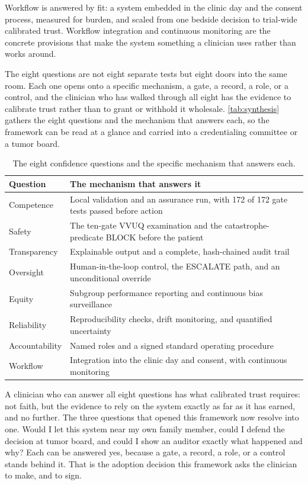 Workflow is answered by fit: a system embedded in the clinic day and the consent
process, measured for burden, and scaled from one bedside decision to trial-wide
calibrated trust. Workflow integration and continuous monitoring are the concrete
provisions that make the system something a clinician uses rather than works around.

The eight questions are not eight separate tests but eight doors into the same room.
Each one opens onto a specific mechanism, a gate, a record, a role, or a control,
and the clinician who has walked through all eight has the evidence to calibrate
trust rather than to grant or withhold it wholesale. \autoref{tab:synthesis}
gathers the eight questions and the mechanism that answers each, so the framework
can be read at a glance and carried into a credentialing committee or a tumor board.

\begin{table}[H]
\footnotesize
\begin{tabularx}{\textwidth}{@{}L{3.0cm} Y@{}}
\toprule
\textbf{Question} & \textbf{The mechanism that answers it}\\
\midrule
Competence & Local validation and an assurance run, with 172 of 172 gate tests passed before action\\
Safety & The ten-gate VVUQ examination and the catastrophe-predicate BLOCK before the patient\\
Transparency & Explainable output and a complete, hash-chained audit trail\\
Oversight & Human-in-the-loop control, the ESCALATE path, and an unconditional override\\
Equity & Subgroup performance reporting and continuous bias surveillance\\
Reliability & Reproducibility checks, drift monitoring, and quantified uncertainty\\
Accountability & Named roles and a signed standard operating procedure\\
Workflow & Integration into the clinic day and consent, with continuous monitoring\\
\bottomrule
\end{tabularx}
\caption{The eight confidence questions and the specific mechanism that answers each.}
\label{tab:synthesis}
\end{table}

A clinician who can answer all eight questions has what calibrated trust requires:
not faith, but the evidence to rely on the system exactly as far as it has earned,
and no further. The three questions that opened this framework now resolve into one.
Would I let this system near my own family member, could I defend the decision at
tumor board, and could I show an auditor exactly what happened and why? Each can be
answered yes, because a gate, a record, a role, or a control stands behind it. That
is the adoption decision this framework asks the clinician to make, and to sign.
